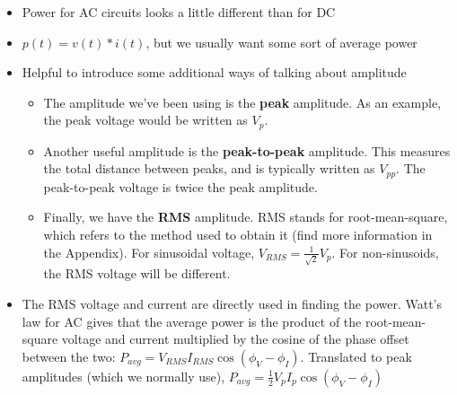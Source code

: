 \begin{itemize}
\item Power for AC circuits looks a little different than for DC
\item $p(t) = v(t)*i(t)$, but we usually want some sort of average power
\item Helpful to introduce some additional ways of talking about amplitude
  \begin{itemize}
  \item The amplitude we've been using is the {\bf peak} amplitude.  As an example, the peak voltage would be written as $V_p$.
  \item Another useful amplitude is the {\bf peak-to-peak} amplitude.  This measures the total distance between peaks, and is typically written as $V_{pp}$.  The peak-to-peak voltage is twice the peak amplitude.
  \item Finally, we have the {\bf RMS} amplitude.  RMS stands for root-mean-square, which refers to the method used to obtain it (find more information in the Appendix). For sinusoidal voltage, $V_{RMS}=\frac{1}{\sqrt{2}}V_p$.  For non-sinusoids, the RMS voltage will be different.
  \end{itemize}
\item The RMS voltage and current are directly used in finding the power.  Watt's law for AC gives that the average power is the product of the root-mean-square voltage and current multiplied by the cosine of the phase offset between the two: $P_{avg}=V_{RMS}I_{RMS}\cos(\phi_V-\phi_I)$.  Translated to peak amplitudes (which we normally use), $P_{avg}=\frac{1}{2}V_pI_p\cos(\phi_V-\phi_I)$
\end{itemize}
